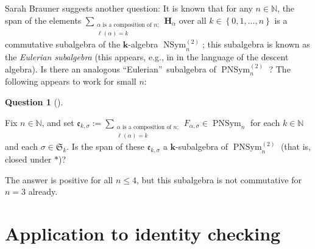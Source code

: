 \documentclass[numbers=enddot,12pt,final,onecolumn,notitlepage]{scrartcl}%
\theoremstyle{definition}
\newtheorem{quest}[theo]{Question}
\newenvironment{question}[1][]
{\begin{quest}[#1]\begin{leftbar}}
{\end{leftbar}\end{quest}}
\newenvironment{question}[1][Question]{\noindent\textbf{#1.} }{\ \rule{0.5em}{0.5em}}
\let\sumnonlimits\sum
\renewcommand{\sum}{\sumnonlimits\limits}
\begin{document}
Sarah Brauner suggests another question: It is known that for any
$n\in\mathbb{N}$, the span of the elements $\sum_{\substack{\alpha\text{ is a
composition of }n;\\\ell\left(  \alpha\right)  =k}}\mathbf{H}_{\alpha}$ over
all $k\in\left\{  0,1,\ldots,n\right\}  $ is a commutative subalgebra of the
$\mathbf{k}$-algebra $\operatorname*{NSym}\nolimits_{n}^{\left(  2\right)  }$;
this subalgebra is known as the \emph{Eulerian subalgebra} (this appears,
e.g., in \cite[\S 4.2]{Schocker} in the language of the descent algebra). Is
there an analogous \textquotedblleft Eulerian\textquotedblright\ subalgebra of
$\operatorname*{PNSym}\nolimits_{n}^{\left(  2\right)  }$ ? The following
appears to work for small $n$:

\begin{question}
Fix $n\in\mathbb{N}$, and set $\mathfrak{e}_{k,\sigma}:=\sum_{\substack{\alpha
\text{ is a composition of }n;\\\ell\left(  \alpha\right)  =k}}F_{\alpha
,\sigma}\in\operatorname*{PNSym}\nolimits_{n}$ for each $k\in\mathbb{N}$ and
each $\sigma\in\mathfrak{S}_{k}$. Is the span of these $\mathfrak{e}%
_{k,\sigma}$ a $\mathbf{k}$-subalgebra of $\operatorname*{PNSym}%
\nolimits_{n}^{\left(  2\right)  }$ (that is, closed under $\ast$)?
\end{question}

The answer is positive for all $n\leq4$, but this subalgebra is not
commutative for $n=3$ already.


\section{\label{sec.idcheck}Application to identity checking}
\end{document}
